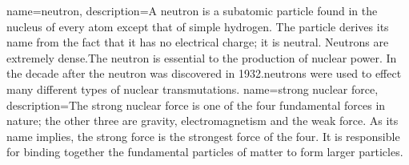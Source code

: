 {
    name=neutron,
    description={A neutron is a subatomic particle found in the nucleus of every atom except that of simple hydrogen.  The particle derives its name from the fact that it has no electrical charge; it is neutral.   Neutrons are extremely dense.The neutron is essential to the production of nuclear power. In the decade after the neutron was discovered in 1932.neutrons were used to effect many different types of nuclear transmutations.}
    }
{
    name=strong nuclear force,
    description={The strong nuclear force is one of the four fundamental forces in nature; the other three are gravity, electromagnetism and the weak force. As its name implies, the strong force is the strongest force of the four. It is responsible for binding together the fundamental particles of matter to form larger particles.}
    }
